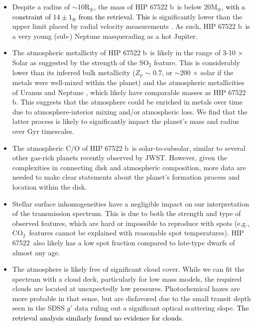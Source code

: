 \documentclass[twocolumn]{aastex63} %
\newcommand{\cotwo}{CO$_2$}
\newcommand{\plname}{HIP 67522 b}
\newcommand{\starname}{HIP 67522}
\newcommand{\newedit}[1]{\textcolor{black}{#1}}
\begin{document}
\begin{itemize}
  \item Despite a radius of $\sim$10R$_{\oplus}$, the mass of \plname\ is below 20M$_{\oplus}$, \newedit{with a constraint of $14\pm1_{\oplus}$ from the retrieval. This} is significantly lower than the upper limit placed by radial velocity measurements \citep[$<$5$M_J$;][]{Rizzuto2020}. As such, \plname\, is a very young (sub-) Neptune masquerading as a hot Jupiter. 
  \item The atmospheric metallicity of \plname\ is likely in the range of 3-10 $\times$ Solar as suggested by the strength of the SO$_2$ feature. This is considerably lower than its inferred bulk metallicity ($Z_p$ $\sim$ 0.7, or $\sim$200 $\times$ solar if the metals were well-mixed within the planet) and the atmospheric metallicities of Uranus and Neptune \citep[C/H $\sim$ 100 $\times$ Solar;][]{Sromovsky2011,Karkoschka2011}, which likely have comparable masses as \plname. This suggests that the atmosphere could be enriched in metals over time due to atmosphere-interior mixing and/or atmospheric loss. We find that the latter process is likely to significantly impact the planet's mass and radius over Gyr timescales.
  \item The atmospheric C/O of \plname\, is solar-to-subsolar, similar to several other gas-rich planets recently observed by JWST. However, given the complexities in connecting disk and atmospheric composition, more data are needed to make clear statements about the planet's formation process and location within the disk.
  \item Stellar surface inhomogeneities have a negligible impact on our interpretation of the transmission spectrum. This is due to both the strength and type of observed features, which are hard or impossible to reproduce with spots (e.g., \cotwo\ features cannot be explained with reasonable spot temperatures). \starname\ also likely has a low spot fraction compared to late-type dwarfs of almost any age. 
  \item The atmosphere is likely free of significant cloud cover. While we can fit the spectrum with a cloud deck, particularly for low mass models, the required clouds are located at unexpectedly low pressures. Photochemical hazes are more probable in that sense, but are disfavored due to the small transit depth seen in the SDSS $g'$ data ruling out a significant optical scattering slope. \newedit{The retrieval analysis similarly found no evidence for clouds.}
\end{itemize}
\end{document}
